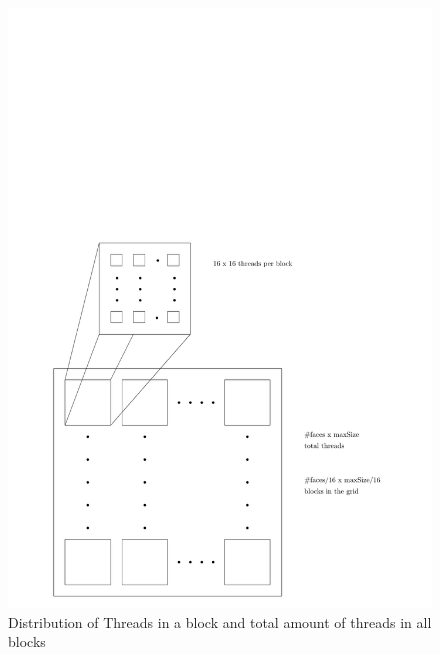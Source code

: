 \begin{figure}
	\includegraphics{Threads.pdf}
	\caption{Distribution of Threads in a block and total amount of threads in all blocks}
	\label{fig:threaddist}
\end{figure}

